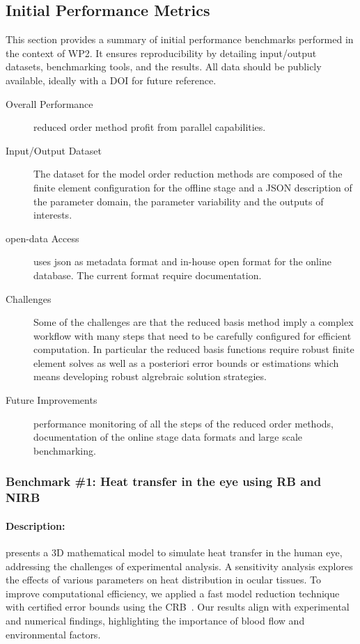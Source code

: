 \subsection{Initial Performance Metrics}
\label{sec:WP2:Feelpp:metrics}

This section provides a summary of initial performance benchmarks performed in the context of WP2. It ensures reproducibility by detailing input/output datasets, benchmarking tools, and the results. All data should be publicly available, ideally with a DOI for future reference.

\begin{description}
    \item[Overall Performance] \Feelpp reduced order method profit from \Feelpp parallel capabilities.
    \item[Input/Output Dataset] The dataset for the \Feelpp model order reduction methods are composed of the finite element configuration for the offline stage and a JSON description of the parameter domain, the parameter variability and the outputs of interests.
    \item[open-data Access] \Feelpp uses json as metadata format and in-house open format for the online database. The current format require documentation.
    \item[Challenges] Some of the challenges are that the reduced basis method imply a complex workflow with many steps that need to be carefully configured for efficient computation. In particular the reduced basis functions require  robust finite element solves as well as a posteriori error bounds or estimations which means developing robust algrebraic solution strategies.
    \item[Future Improvements] performance monitoring of all the steps of the reduced order methods, documentation of the online stage data formats and large scale benchmarking.
\end{description}



\subsubsection{Benchmark \#1: Heat transfer in the eye using \ac{RB} and \ac{NIRB}}

\paragraph{Description:} \cite{saigre_model_2024} presents a 3D mathematical model to simulate heat transfer in the human eye, addressing the challenges of experimental analysis. A sensitivity analysis explores the effects of various parameters on heat distribution in ocular tissues. To improve computational efficiency, we applied a fast model reduction technique with certified error bounds using the \ac{CRB}~\cite{prudhomme_reliable_2002}. Our results align with experimental and numerical findings, highlighting the importance of blood flow and environmental factors.

